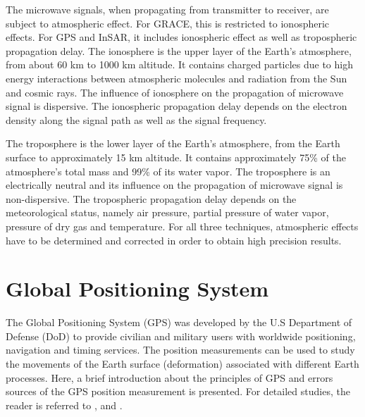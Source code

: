 The microwave signals, when propagating from transmitter to receiver, are subject to atmospheric effect.  For GRACE, this is restricted to ionospheric effects.  For GPS and InSAR, it includes ionospheric effect as well as tropospheric propagation delay. The ionosphere is the upper layer of the Earth’s atmosphere, from about 60 km to 1000 km altitude.  It contains charged particles due to high energy interactions between atmospheric molecules and radiation from the Sun and cosmic rays.  The influence of ionosphere on the propagation of microwave signal is dispersive.  The ionospheric propagation delay depends on the electron density along the signal path as well as the signal frequency.  

The troposphere is the lower layer of the Earth’s atmosphere, from the Earth surface to approximately 15 km altitude.  It contains approximately 75\% of the atmosphere’s total mass and 99\% of its water vapor.   The troposphere is an electrically neutral and its influence on the propagation of microwave signal is non-dispersive.  The tropospheric propagation delay depends on the meteorological status, namely air pressure, partial pressure of water vapor, pressure of dry gas and temperature.  For all three techniques, atmospheric effects have to be determined and corrected in order to obtain high precision results.

\section{Global Positioning System}
The Global Positioning System (GPS) was developed by the U.S Department of Defense (DoD) to provide civilian and military users with worldwide positioning, navigation and timing services.  The position measurements can be used to study the movements of the Earth surface (deformation) associated with different Earth processes.  Here, a brief introduction about the principles of GPS and errors sources of the GPS position measurement is presented.  For detailed studies, the reader is referred to \citet{dixon1991chpt2},\citet{mao1999chpt2} and \citet{hofmann2001chpt2}. 

